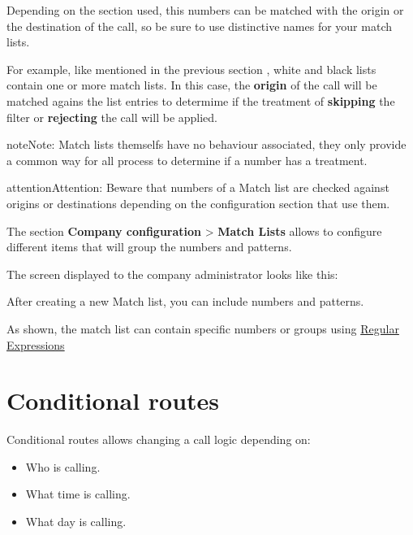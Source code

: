 \documentclass[letterpaper,10pt,english]{sphinxmanual}
\begin{document}
Depending on the section used, this numbers can be matched with the origin or
the destination of the call, so be sure to use distinctive names for your match
lists.

For example, like mentioned in the previous section {\hyperref[pbx_features/external_filters:external\string-filters]{}},
white and black lists contain one or more match lists. In this case, the
\textbf{origin} of the call will be matched agains the list entries to determime if
the treatment of \textbf{skipping} the filter or \textbf{rejecting} the call will be applied.

\begin{notice}{note}{Note:}
Match lists themselfs have no behaviour associated, they only provide
a common way for all process to determine if a number has a treatment.
\end{notice}

\begin{notice}{attention}{Attention:}
Beware that numbers of a Match list are checked against origins
or destinations depending on the configuration section that use them.
\end{notice}

The section \textbf{Company configuration} \textgreater{} \textbf{Match Lists} allows to configure
different items that will group the numbers and patterns.

The screen displayed to the company administrator looks like this:


After creating a new Match list, you can include numbers and patterns.


As shown, the match list can contain specific numbers or groups using
\href{http://php.net/manual/en/reference.pcre.pattern.syntax.php}{Regular Expressions}


\section{Conditional routes}
\label{pbx_features/conditional_routes::doc}\label{pbx_features/conditional_routes:conditional-routes}\label{pbx_features/conditional_routes:id1}
Conditional routes allows changing a call logic depending on:
\begin{itemize}
\item {} 
Who is calling.

\item {} 
What time is calling.

\item {} 
What day is calling.

\end{itemize}
\end{document}
